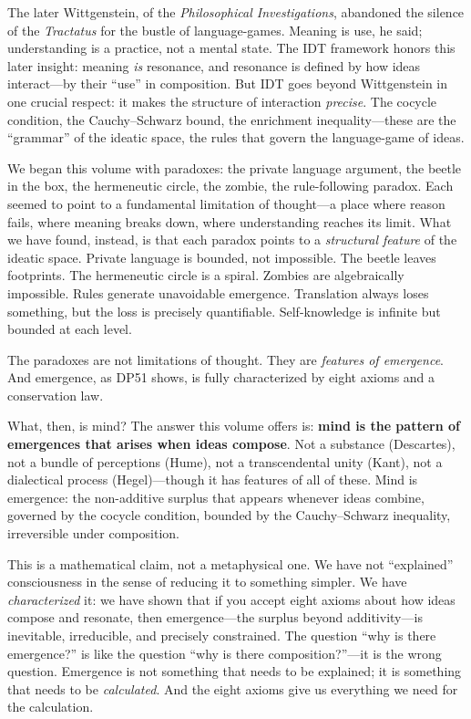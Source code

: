 The later Wittgenstein, of the \textit{Philosophical Investigations},
abandoned the silence of the \textit{Tractatus} for the bustle of
language-games.  Meaning is use, he said; understanding is a practice,
not a mental state.  The IDT framework honors this later insight: meaning
\emph{is} resonance, and resonance is defined by how ideas interact---by
their ``use'' in composition.  But IDT goes beyond Wittgenstein in one
crucial respect: it makes the structure of interaction \emph{precise}.  The
cocycle condition, the Cauchy--Schwarz bound, the enrichment inequality---these
are the ``grammar'' of the ideatic space, the rules that govern the
language-game of ideas.

We began this volume with paradoxes: the private language argument, the
beetle in the box, the hermeneutic circle, the zombie, the rule-following
paradox.  Each seemed to point to a fundamental limitation of thought---a
place where reason fails, where meaning breaks down, where understanding
reaches its limit.  What we have found, instead, is that each paradox
points to a \emph{structural feature} of the ideatic space.  Private
language is bounded, not impossible.  The beetle leaves footprints.  The
hermeneutic circle is a spiral.  Zombies are algebraically impossible.
Rules generate unavoidable emergence.  Translation always loses something,
but the loss is precisely quantifiable.  Self-knowledge is infinite but
bounded at each level.

The paradoxes are not limitations of thought.  They are \emph{features of
emergence}.  And emergence, as DP51 shows, is fully characterized by
eight axioms and a conservation law.

\medskip

What, then, is mind?  The answer this volume offers is: \textbf{mind is the
pattern of emergences that arises when ideas compose}.  Not a substance
(Descartes), not a bundle of perceptions (Hume), not a transcendental unity
(Kant), not a dialectical process (Hegel)---though it has features of all
of these.  Mind is emergence: the non-additive surplus that appears whenever
ideas combine, governed by the cocycle condition, bounded by the
Cauchy--Schwarz inequality, irreversible under composition.

This is a mathematical claim, not a metaphysical one.  We have not
``explained'' consciousness in the sense of reducing it to something simpler.
We have \emph{characterized} it: we have shown that if you accept eight
axioms about how ideas compose and resonate, then emergence---the surplus
beyond additivity---is inevitable, irreducible, and precisely constrained.
The question ``why is there emergence?'' is like the question ``why is there
composition?''---it is the wrong question.  Emergence is not something that
needs to be explained; it is something that needs to be \emph{calculated}.
And the eight axioms give us everything we need for the calculation.

